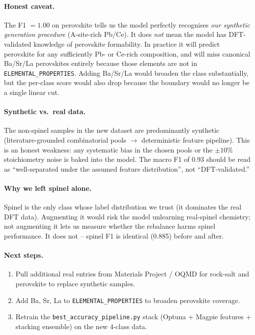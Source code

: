 \documentclass[11pt]{article}
\begin{document}
\paragraph{Honest caveat.}
The F1 $=1.00$ on perovskite tells us the model perfectly recognises
\emph{our synthetic generation procedure} (A-site-rich Pb/Ce). It does
\emph{not} mean the model has DFT-validated knowledge of perovskite
formability. In practice it will predict perovskite for any
sufficiently Pb- or Ce-rich composition, and will miss canonical
Ba/Sr/La perovskites entirely because those elements are not in
\texttt{ELEMENTAL\_PROPERTIES}. Adding Ba/Sr/La would broaden the class
substantially, but the per-class score would also drop because the boundary
would no longer be a single linear cut.

\paragraph{Synthetic vs.\ real data.}
The non-spinel samples in the new dataset are predominantly synthetic
(literature-grounded combinatorial pools $\to$ deterministic feature pipeline).
This is an honest weakness: any systematic bias in the chosen pools or the
$\pm 10\%$ stoichiometry noise is baked into the model. The macro F1 of
$0.93$ should be read as ``well-separated under the assumed feature
distribution'', not ``DFT-validated.''

\paragraph{Why we left spinel alone.}
Spinel is the only class whose label distribution we trust (it dominates the
real DFT data). Augmenting it would risk the model unlearning real-spinel
chemistry; not augmenting it lets us measure whether the rebalance harms
spinel performance. It does not -- spinel F1 is identical (0.885) before and
after.

\paragraph{Next steps.}
\begin{enumerate}
  \item Pull additional real entries from Materials Project / OQMD for
        rock-salt and perovskite to replace synthetic samples.
  \item Add Ba, Sr, La to \texttt{ELEMENTAL\_PROPERTIES} to broaden
        perovskite coverage.
  \item Retrain the \texttt{best\_accuracy\_pipeline.py} stack (Optuna +
        Magpie features + stacking ensemble) on the new 4-class data.
\end{enumerate}
\end{document}

